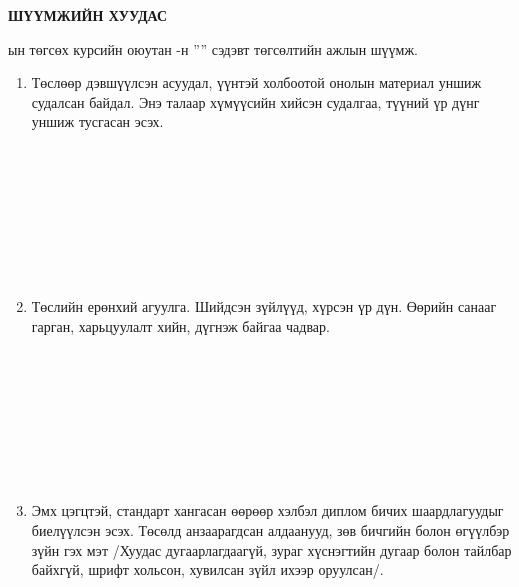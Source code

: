 \begin{titlepage}
\begin{center}

{\scshape\Large \univname\par} %
{\scshape\large \facname\par}\vspace{1cm} %

\textbf{{\Large ШҮҮМЖИЙН ХУУДАС}}\\[1cm]

\end{center}

\normalsize

\deptname ын төгсөх курсийн оюутан \shortname -н ''\ttitle'' сэдэвт төгсөлтийн ажлын шүүмж.

\begin{enumerate}
\item Төслөөр дэвшүүлсэн асуудал, үүнтэй холбоотой онолын материал уншиж судалсан байдал. Энэ талаар хүмүүсийн хийсэн судалгаа, түүний үр дүнг уншиж тусгасан эсэх.
\begin{center}
\dotfill \\[0.1cm]
\dotfill \\[0.1cm]
\dotfill \\[0.1cm]
\dotfill \\[0.1cm]
\dotfill \\[0.1cm]
\dotfill \\[0.1cm]
\dotfill \\[0.4cm]
\end{center}
\item Төслийн ерөнхий агуулга. Шийдсэн зүйлүүд, хүрсэн үр дүн. Өөрийн санааг гарган, харьцуулалт хийн, дүгнэж байгаа чадвар.
\begin{center}
\dotfill \\[0.1cm]
\dotfill \\[0.1cm]
\dotfill \\[0.1cm]
\dotfill \\[0.1cm]
\dotfill \\[0.1cm]
\dotfill \\[0.1cm]
\dotfill \\[0.4cm]
\end{center}
\item Эмх цэгцтэй, стандарт хангасан өөрөөр хэлбэл диплом бичих шаардлагуудыг биелүүлсэн эсэх. Төсөлд анзаарагдсан алдаанууд, зөв бичгийн болон өгүүлбэр зүйн гэх мэт /Хуудас дугаарлагдаагүй, зураг хүснэгтийн дугаар болон тайлбар байхгүй, шрифт хольсон, хувилсан зүйл ихээр оруулсан/.

\end{enumerate}
\end{titlepage}
